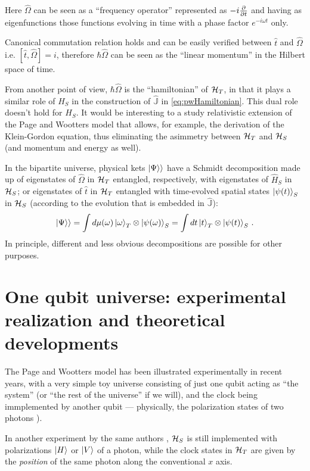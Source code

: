 Here $\hat{\Omega}$ can be seen as a ``frequency operator''
represented as $-i\pdv{t}$ and having as eigenfunctions
those functions evolving in time with a phase factor $e^{-i \omega t}$ only.

Canonical commutation relation holds and can be easily verified
between $\hat{t}$ and $\hat{\Omega}$
i.e. $[\hat{t}, \hat{\Omega}] = i$,
therefore $\hbar\hat{\Omega}$ can be seen as the ``linear momentum''
in the Hilbert space of time.

From another point of view, $\hbar\hat{\Omega}$ is the ``hamiltonian'' of $\mathcal{H}_T$,
in that it plays a similar role of $H_S$ in the construction of
$\hat{\mathbb{J}}$ in \eqref{eq:pwHamiltonian}. This dual role doesn't hold
for $H_S$. It would be interesting to a study relativistic extension of the
Page and Wootters model that allows, for example, the derivation of the Klein-Gordon
equation, thus eliminating the asimmetry between
$\mathcal{H}_T$ and $\mathcal{H}_S$ (and momentum and energy as well).

In the bipartite universe, physical kets $|\Psi\rangle\rangle$ have a Schmidt decomposition
made up of
eigenstates of $\hat{\Omega}$ in $\mathcal{H}_T$
entangled, respectively, with
eigenstates of $\hat{H}_S$ in $\mathcal{H}_S$;
or eigenstates of $\hat{t}$ in $\mathcal{H}_T$
entangled with time-evolved spatial states $\ket{\psi(t)}_S$ in $\mathcal{H}_S$
(according to the evolution that is embedded in $\hat{\mathbb{J}}$):
\begin{equation}
  |\Psi\rangle\rangle = \int d\mu(\omega) \ket{\omega}_{T}\otimes\ket{\psi(\omega)}_{S} = \int dt \ket{t}_{T} \otimes \ket{\psi(t)}_{S}\,\text{.} 
\end{equation}
In principle, different and less obvious decompositions are possible for other purposes.

\section{One qubit universe: experimental realization and theoretical developments}

The Page and Wootters model has been illustrated experimentally in recent years,
with a very simple toy universe consisting of just one qubit acting as ``the system'' (or
``the rest of the universe'' if we will), and the clock being immplemented by another qubit ---
physically, the polarization states of two photons \parencite{Moreva:synthetic,Moreva:illustration}).

In another experiment by the same authors \parencite{Moreva_position}, $\mathcal{H}_S$ is still implemented with 
polarizations $\ket{H}$ or $\ket{V}$ of a photon, while the clock states in $\mathcal{H}_T$
are given by the \emph{position} of the same photon along the conventional $x$ axis.

